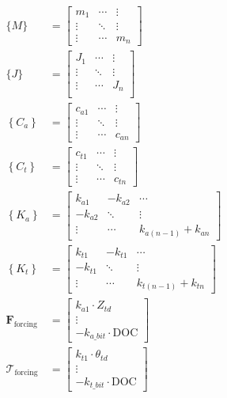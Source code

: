 \begin{align}
	\{M\} &= \left[\begin{array}{ccc}
				m_1 & \cdots & \vdots \\
				\vdots & \ddots & \vdots \\
				\vdots & \cdots & m_n
				\end{array}\right] \\
	\{J\} &= \left[\begin{array}{ccc}
			J_1 & \cdots & \vdots \\
			\vdots & \ddots & \vdots \\
			\vdots & \cdots & J_n  \\
  			\end{array}\right] \\
	\left\{C_a\right\} &= \left[\begin{array}{ccc}
							c_{a 1} & \cdots & \vdots \\
							\vdots & \ddots & \vdots \\
							\vdots & \cdots & c_{a n}
							\end{array}\right] \\
	\left\{C_t\right\} &= \left[\begin{array}{ccc}
							c_{t 1} & \cdots & \vdots \\
							\vdots & \ddots & \vdots \\
							\vdots & \cdots & c_{t n}
							\end{array}\right] \\
 	\left\{K_a\right\} &= \left[\begin{array}{ccc}
							k_{a 1} & -k_{a 2} & \cdots \\
							-k_{a 2} & \ddots & \vdots \\
							\vdots & \cdots & k_{a(n-1)}+k_{a n}
							\end{array}\right] \\
	\left\{K_t\right\} &= \left[\begin{array}{ccc}
							k_{t 1} & -k_{t 1} & \cdots \\
							-k_{t 1} & \ddots & \vdots \\
							\vdots & \cdots & k_{t(n-1)}+k_{t n}
							\end{array}\right] \\
  	\boldsymbol{F}_{\text{forcing}} &= \left[\begin{array}{c}
							k_{a 1} \cdot Z_{td} \\
							\vdots \\
							-k_{a\_bit} \cdot \text{DOC}
							\end{array}\right] \\
	\boldsymbol{\mathcal{T}}_{\text{forcing}} &= \left[\begin{array}{c}
							k_{t 1} \cdot \theta_{td} \\
							\vdots \\
							-k_{t\_bit} \cdot \text{DOC}
							\end{array}\right]
	\label{eq:emmatrixform}
\end{align}

